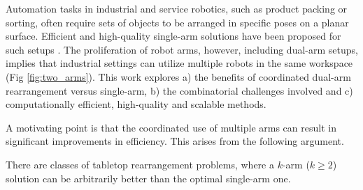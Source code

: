 
Automation tasks in industrial and service robotics, such as product packing or sorting, often require sets of objects to be arranged in
specific poses on a planar surface. Efficient and high-quality
single-arm solutions have been proposed for such
setups \cite{193}. The proliferation of robot arms, however, including dual-arm setups, implies that industrial settings can utilize multiple robots in the same workspace (Fig \ref{fig:two_arms}). This work explores a) the benefits of coordinated dual-arm rearrangement versus single-arm, b) the combinatorial challenges involved and c) computationally efficient, high-quality and scalable methods.

 


A motivating point is that the coordinated use of multiple arms can
result in significant improvements in efficiency. This arises from the following argument.

\vspace{-.1in}
\begin{lemma}\label{l:k-arm-lower-bound}
There are classes of tabletop rearrangement problems, where a $k$-arm
($k \ge 2$) solution can be arbitrarily better than the optimal
single-arm one.
\vspace{-.3in}
\end{lemma}

